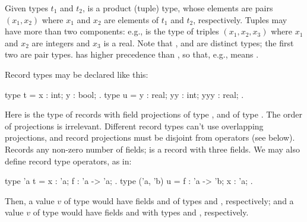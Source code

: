 Given types $t_1$ and $t_2$,  is a product (tuple)
type, whose elements are pairs $(x_1, x_2)$ where $x_1$ and $x_2$ are
elements of $t_1$ and $t_2$, respectively. Tuples may have more than
two components: e.g.,  is the type of triples
$(x_1, x_2, x_3)$ where $x_1$ and $x_2$ are integers and $x_3$ is a real.
Note that ,  and
 are distinct types; the first two are pair types.
\ec{*} has higher precedence than \ec{->}, so that, e.g.,
 means .

Record types may be declared like this:
\begin{easycrypt}{}{}
type t = { x : int; y : bool; }.
type u = { y : real; yy : int; yyy : real; }.
\end{easycrypt}
Here  is the type of records with field projections  of
type , and  of type . The order of projections is
irrelevant.  Different record types can't use overlapping projections,
and record projections must be disjoint from operators (see
below). Records any non-zero number of fields;  is a record with
three fields. We may also define record type operators, as in:
\begin{easycrypt}{}{}
type 'a t = { x : 'a; f : 'a -> 'a; }.
type ('a, 'b) u = { f : 'a -> 'b; x : 'a; }.
\end{easycrypt}
Then, a value $v$ of type  would have fields  and
 of types  and , respectively; and
a value $v$ of type  would have fields  and
 with types  and , respectively.

